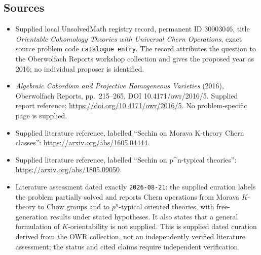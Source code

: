 \documentclass[11pt]{article}
\begin{document}
\subsection{Sources}
\begin{itemize}
\item Supplied local UnsolvedMath registry record, permanent ID \(30003046\), title \emph{Orientable Cohomology Theories with Universal Chern Operations}, exact source problem code \texttt{catalogue entry}. The record attributes the question to the Oberwolfach Reports workshop collection and gives the proposed year as 2016; no individual proposer is identified.
\item \emph{Algebraic Cobordism and Projective Homogeneous Varieties} (2016), Oberwolfach Reports, pp.~215--265, DOI 10.4171/owr/2016/5. Supplied report reference: \url{https://doi.org/10.4171/owr/2016/5}. No problem-specific page is supplied.
\item Supplied literature reference, labelled ``Sechin on Morava K-theory Chern classes'': \url{https://arxiv.org/abs/1605.04444}.
\item Supplied literature reference, labelled ``Sechin on p\textasciicircum n-typical theories'': \url{https://arxiv.org/abs/1805.09050}.
\item Literature assessment dated exactly \texttt{2026-08-21}: the supplied curation labels the problem partially solved and reports Chern operations from Morava \(K\)-theory to Chow groups and to \(p^n\)-typical oriented theories, with free-generation results under stated hypotheses. It also states that a general formulation of \(K\)-orientability is not supplied. This is supplied dated curation derived from the OWR collection, not an independently verified literature assessment; the status and cited claims require independent verification.
\end{itemize}
\end{document}

